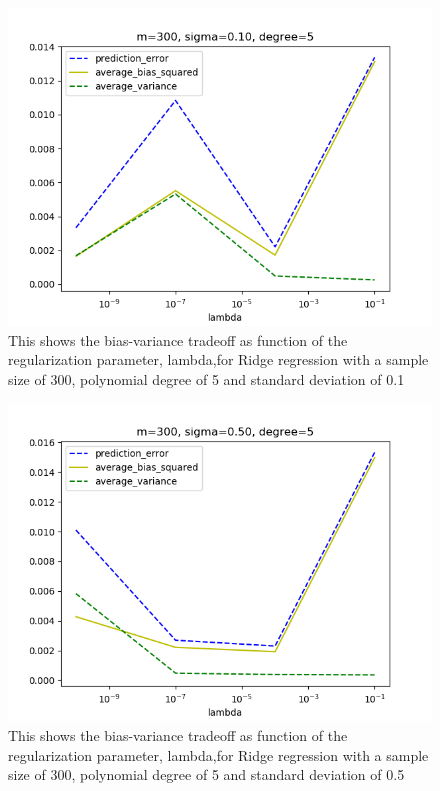 \FloatBarrier
\begin{figure}[!ht]
	\centering
	\FloatBarrier
	\includegraphics[width=1\textwidth]{plot_ridge_without_r2/ridgeprediction_error_m300_d5_s10.png}
	
	\caption{This shows the bias-variance tradeoff as function of the regularization parameter, lambda,for Ridge regression with a sample size of 300, polynomial degree of 5 and standard deviation of 0.1}
	\label{fig:2}
\end{figure}
\FloatBarrier

\medskip

\FloatBarrier
\begin{figure}[!ht]
	\centering
	\FloatBarrier
	\includegraphics[width=1\textwidth]{plot_ridge_without_r2/ridgeprediction_error_m300_d5_s50.png}
	
	\caption{This shows the bias-variance tradeoff as function of the regularization parameter, lambda,for Ridge regression with a sample size of 300, polynomial degree of 5 and standard deviation of 0.5}
	\label{fig:2}
\end{figure}
\FloatBarrier

